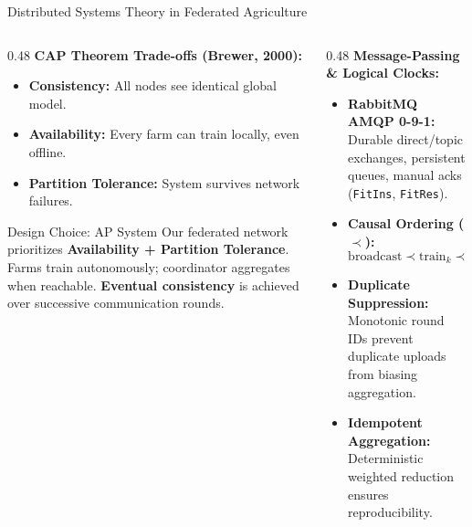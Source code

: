 \documentclass[aspectratio=169]{beamer}
\begin{document}
\begin{frame}{Distributed Systems Theory in Federated Agriculture}
    \begin{columns}[T]
        \begin{column}{0.48\textwidth}
            \textbf{CAP Theorem Trade-offs (Brewer, 2000):}
            \begin{itemize}
                \item \textbf{Consistency:} All nodes see identical global model.
                \item \textbf{Availability:} Every farm can train locally, even offline.
                \item \textbf{Partition Tolerance:} System survives network failures.
            \end{itemize}
            \vspace{0.15cm}
            \begin{alertblock}{Design Choice: AP System}
                \footnotesize Our federated network prioritizes \textbf{Availability + Partition Tolerance}. Farms train autonomously; coordinator aggregates when reachable. \textbf{Eventual consistency} is achieved over successive communication rounds.
            \end{alertblock}
        \end{column}
        \begin{column}{0.48\textwidth}
            \textbf{Message-Passing \& Logical Clocks:}
            \begin{itemize}
                \item \textbf{RabbitMQ AMQP 0-9-1:} Durable direct/topic exchanges, persistent queues, manual acks (\texttt{FitIns}, \texttt{FitRes}).
                \item \textbf{Causal Ordering ($\prec$):}
                {\footnotesize
                \[
                \text{broadcast} \prec \text{train}_k \prec \text{upload} \prec \text{aggregate}
                \]}
                \item \textbf{Duplicate Suppression:} Monotonic round IDs prevent duplicate uploads from biasing aggregation.
                \item \textbf{Idempotent Aggregation:} Deterministic weighted reduction ensures reproducibility.
            \end{itemize}
        \end{column}
    \end{columns}
\end{frame}
\end{document}
